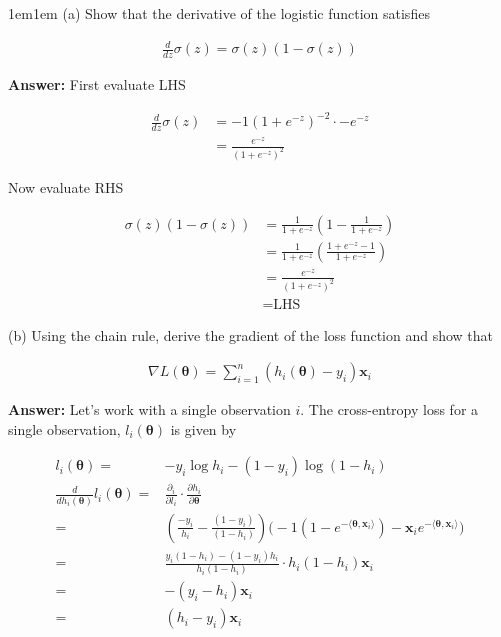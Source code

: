 \documentclass[11pt]{article}
\begin{document}
    \begin{adjustwidth}{1em}{1em}
        (a) Show that the derivative of the logistic function satisfies 

        \begin{align*}
            \frac{d}{dz}\sigma(z) = \sigma(z)(1 - \sigma(z))
        \end{align*}

        \textbf{Answer:} First evaluate LHS 

        \begin{align*}
            \frac{d}{dz}\sigma(z)
            &= -1(1 + e^{-z})^{-2} \cdot -e^{-z} \\ 
            &= \frac{e^{-z}}{(1 + e^{-z})^2}
        \end{align*}

        Now evaluate RHS

        \begin{align*}
            \sigma(z)(1 - \sigma(z))
            &= \frac{1}{1 + e^{-z}}\left(1 - \frac{1}{1 + e^{-z}}\right) \\ 
            &= \frac{1}{1 + e^{-z}}\left(\frac{1 + e^{-z} - 1}{1 + e^{-z}}\right) \\ 
            &= \frac{e^{-z}}{(1 + e^{-z})^2} \\ 
            &= \text{LHS}
        \end{align*}

        (b) Using the chain rule, derive the gradient of the loss function and show that

        \begin{align*}
            \nabla L(\boldsymbol{\theta}) = \sum_{i = 1}^n (h_i(\boldsymbol{\theta}) -
            y_i)\mathbf{x}_i
        \end{align*}

        \textbf{Answer:} Let's work with a single observation $i$. The cross-entropy loss for a
        single observation, $l_i(\boldsymbol{\theta})$ is given by 

        \begin{align*}
            l_i(\boldsymbol{\theta})
            =& -y_i \log h_i - (1 - y_i)\log(1 - h_i) \\ 
            \frac{d}{dh_i(\boldsymbol{\theta})}l_i(\boldsymbol{\theta}) 
            =& \frac{\partial_i}{\partial l_i} \cdot \frac{\partial h_i}{\partial 
            \boldsymbol{\theta}} \\
            =& \left(\frac{-y_i}{h_i} - \frac{(1 - y_i)}{(1 - h_i)}\right) \bigg(-1 (1 -
            e^{-\langle\boldsymbol{\theta}, \mathbf{x}_i\rangle}) -\mathbf{x}_i
            e^{-\langle\boldsymbol{\theta}, \mathbf{x}_i\rangle}\bigg) \\ 
                =& \frac{y_i(1 - h_i) - (1 - y_i)h_i}{h_i(1 - h_i)} \cdot h_i(1 - h_i)\mathbf{x}_i\\ 
                =& -(y_i - h_i)\mathbf{x}_i \\ 
                =& (h_i - y_i)\mathbf{x}_i
        \end{align*}


\end{adjustwidth}
\end{document}
